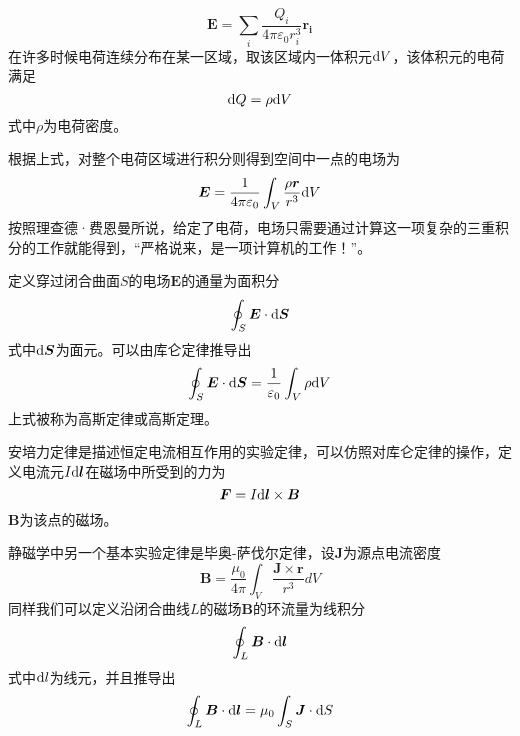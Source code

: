 \documentclass[UTF8,a4paper,10pt]{ctexart}
\begin{document}
\begin{multicols}{2}
        \begin{equation}
            \bm{E} = \sum_i\frac{Q_i}{4\pi\varepsilon_0r_i^3}\bm{r_i}
        \end{equation}
        在许多时候电荷连续分布在某一区域，取该区域内一体积元${\rm d}V$，该体积元的电荷满足
        \begin{equation*}
            {\rm d}Q = \rho{\rm d}V
        \end{equation*}
        式中$\rho$为电荷密度。\par
        根据上式，对整个电荷区域进行积分则得到空间中一点的电场为
        \begin{equation}\label{Coulomb_2}
            \bm{E}=\frac{1}{4\pi\varepsilon_0}\int_V\frac{\rho\bm{r}}{r^3}{\rm d}V
        \end{equation}
        按照理查德·费恩曼所说，给定了电荷，电场只需要通过计算这一项复杂的三重积分的工作就能得到，“严格说来，是一项计算机的工作！”。\par
        定义穿过闭合曲面$S$的电场$\bm{E}$的通量为面积分
        \begin{equation*}
            \oint_S\bm{E}\cdot{\rm d}\bm{S}
        \end{equation*}
        式中${\rm d}\bm{S}$为面元。可以由库仑定律推导出
        \begin{equation}
            \oint_S\bm{E}\cdot{\rm d}\bm{S} = \frac{1}{\varepsilon_0}\int_V\rho{\rm d}V
        \end{equation}
        上式被称为高斯定律或高斯定理。\par
        安培力定律是描述恒定电流相互作用的实验定律，可以仿照对库仑定律的操作，定义电流元$I{\rm d}\bm{l}$在磁场中所受到的力为
        \begin{equation}
            \bm{F}=I{\rm d}\bm{l}\times\bm{B}
        \end{equation}
        $\bm{B}$为该点的磁场。\par
        静磁学中另一个基本实验定律是毕奥-萨伐尔定律，设$\bm{J}$为源点电流密度
        \begin{equation}
            \bm{B}=\frac{\mu_0}{4\pi}\int_V\frac{\bm{J}\times\bm{r}}{r^3}dV
        \end{equation}
        同样我们可以定义沿闭合曲线$L$的磁场$\bm{B}$的环流量为线积分
        \begin{equation*}
            \oint_L\bm{B}\cdot{\rm d}\bm{l}
        \end{equation*}
        式中${\rm d}l$为线元，并且推导出
        \begin{equation}
            \oint_L\bm{B}\cdot{\rm d}\bm{l} = \mu_0\int_S\bm{J}\cdot{\rm d}S

\end{equation}
\end{multicols}
\end{document}
